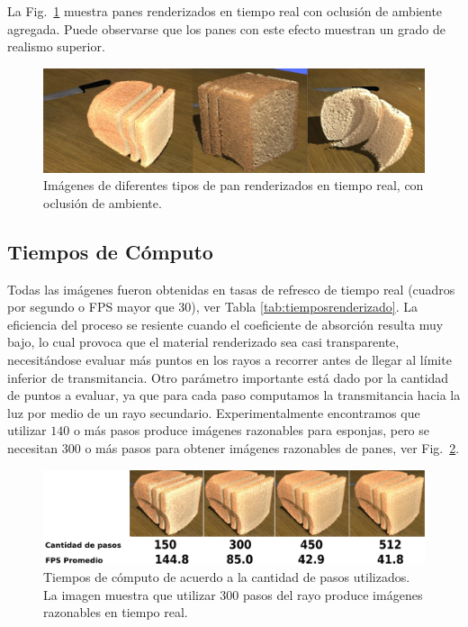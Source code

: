 La Fig.~\ref{fg:breads} muestra panes renderizados en tiempo real con oclusión de ambiente agregada.
Puede observarse que los panes con este efecto muestran un grado de realismo superior.

\begin{figure}[htb!]
  \centerline{\includegraphics[width=13cm]{breads}}
  \caption{Imágenes de diferentes tipos de pan renderizados en tiempo real, con oclusión de ambiente.}
  \label{fg:breads}
\end{figure}



\subsection*{Tiempos de Cómputo}

Todas las imágenes fueron obtenidas en tasas de refresco de tiempo real (cuadros por segundo o \acrshort{FPS} mayor que $30$), ver Tabla \ref{tab:tiemposrenderizado}.
La eficiencia del proceso se resiente cuando el coeficiente de absorción resulta muy bajo, lo cual provoca que el material renderizado sea casi transparente, necesitándose evaluar más puntos en los rayos a recorrer antes de llegar al límite inferior de transmitancia.
Otro parámetro importante está dado por la cantidad de puntos a evaluar, ya que para cada paso computamos la transmitancia hacia la luz por medio de un rayo secundario.
Experimentalmente encontramos que utilizar $140$ o más pasos produce imágenes razonables para esponjas, pero se necesitan $300$ o más pasos para obtener imágenes razonables de panes, ver Fig.~\ref{fg:stepcount}.


\begin{figure}
  \centerline{\includegraphics[width=13cm]{figures/stepcount}}
  \caption[Tiempos de cómputo de acuerdo a la cantidad de pasos utilizados]{Tiempos de cómputo de acuerdo a la cantidad de pasos utilizados. La imagen muestra que utilizar $300$ pasos del rayo produce imágenes razonables en tiempo real.}
  \label{fg:stepcount}
\end{figure}

